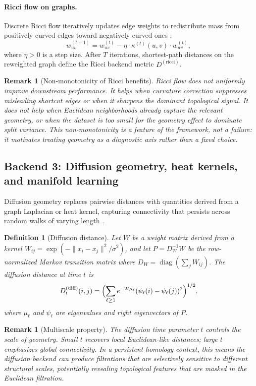 \documentclass[11pt]{article}
\newtheorem{definition}[theorem]{Definition}
\newtheorem{remark}[theorem]{Remark}
\begin{document}
\paragraph{Ricci flow on graphs.}
Discrete Ricci flow iteratively updates edge weights to redistribute mass from positively curved edges toward negatively curved ones \cite{ni2019community}:
\[
w_{uv}^{(t+1)} = w_{uv}^{(t)} - \eta \cdot \kappa^{(t)}(u,v) \cdot w_{uv}^{(t)},
\]
where $\eta > 0$ is a step size.
After $T$ iterations, shortest-path distances on the reweighted graph define the Ricci backend metric $D^{(\text{ricci})}$.

\begin{remark}[Non-monotonicity of Ricci benefits]
Ricci flow does not uniformly improve downstream performance.
It helps when curvature correction suppresses misleading shortcut edges or when it sharpens the dominant topological signal.
It does not help when Euclidean neighborhoods already capture the relevant geometry, or when the dataset is too small for the geometry effect to dominate split variance.
This non-monotonicity is a feature of the framework, not a failure: it motivates treating geometry as a diagnostic axis rather than a fixed choice.
\end{remark}

\subsection{Backend 3: Diffusion geometry, heat kernels, and manifold learning}
\label{sec:diffusion}

Diffusion geometry replaces pairwise distances with quantities derived from a graph Laplacian or heat kernel, capturing connectivity that persists across random walks of varying length \cite{coifman2006diffusion}.

\begin{definition}[Diffusion distance]
Let $W$ be a weight matrix derived from a kernel $W_{ij} = \exp(-\|x_i - x_j\|^2 / \sigma^2)$, and let $P = D_W^{-1} W$ be the row-normalized Markov transition matrix where $D_W = \operatorname{diag}(\sum_j W_{ij})$.
The \emph{diffusion distance} at time $t$ is
\[
D^{(\text{diff})}_{t}(i,j) = \Bigl( \sum_{\ell \ge 1} e^{-2t\mu_\ell} (\psi_\ell(i) - \psi_\ell(j))^2 \Bigr)^{1/2},
\]
where $\mu_\ell$ and $\psi_\ell$ are eigenvalues and right eigenvectors of $P$.
\end{definition}

\begin{remark}[Multiscale property]
The diffusion time parameter $t$ controls the scale of geometry.
Small $t$ recovers local Euclidean-like distances; large $t$ emphasizes global connectivity.
In a persistent-homology context, this means the diffusion backend can produce filtrations that are selectively sensitive to different structural scales, potentially revealing topological features that are masked in the Euclidean filtration.
\end{remark}
\end{document}
